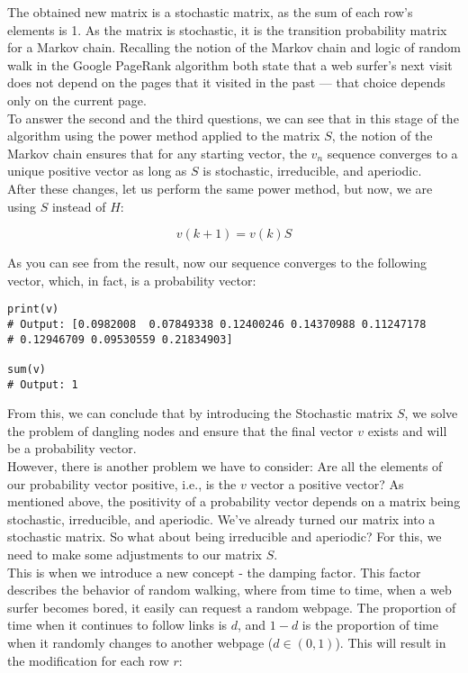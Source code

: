 \documentclass{article}
\begin{document}
The obtained new matrix is a stochastic matrix, as the sum of each row's elements is 1. As the matrix is stochastic, it is the transition probability matrix for a Markov chain. Recalling the notion of the Markov chain and logic of random walk in the Google PageRank algorithm both state that a web surfer's next visit does not depend on the pages that it visited in the past — that choice depends only on the current page.
\\

To answer the second and the third questions, we can see that in this stage of the algorithm using the power method applied to the matrix \( S \), the notion of the Markov chain ensures that for any starting vector, the \( v_n \) sequence converges to a unique positive vector as long as \( S \) is stochastic, irreducible, and aperiodic.
\\

After these changes, let us perform the same power method, but now, we are using \( S \) instead of \( H \):

\[ v(k+1) = v(k)S \]

As you can see from the result, now our sequence converges to the following vector, which, in fact, is a probability vector:

\begin{verbatim}
print(v)
# Output: [0.0982008  0.07849338 0.12400246 0.14370988 0.11247178 
# 0.12946709 0.09530559 0.21834903]

sum(v)
# Output: 1
\end{verbatim}


From this, we can conclude that by introducing the Stochastic matrix \( S \), we solve the problem of dangling nodes and ensure that the final vector \( v \) exists and will be a probability vector.
\\

However, there is another problem we have to consider: Are all the elements of our probability vector positive, i.e., is the \( v \) vector a positive vector? As mentioned above, the positivity of a probability vector depends on a matrix being stochastic, irreducible, and aperiodic. We've already turned our matrix into a stochastic matrix. So what about being irreducible and aperiodic? For this, we need to make some adjustments to our matrix \( S \).
\\


This is when we introduce a new concept - the damping factor. This factor describes the behavior of random walking, where from time to time, when a web surfer becomes bored, it easily can request a random webpage. The proportion of time when it continues to follow links is \( d \), and \( 1-d \) is the proportion of time when it randomly changes to another webpage (\( d \in (0, 1) \)). This will result in the modification for each row \( r \):
\end{document}
